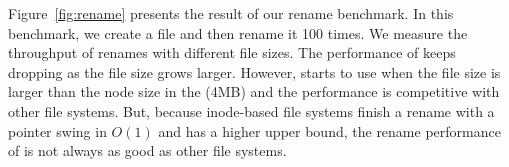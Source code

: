 Figure~\ref{fig:rename} presents the result of our rename benchmark. In this
benchmark, we create a file and then rename it 100 times.
We measure the throughput of renames with different file sizes.
The performance of \betrfsOne keeps dropping as the file size grows larger.
However, \betrfsFour starts to use \rr when the file size is larger than the
node size in the \bet (4MB) and the performance is competitive with other file
systems.
But, because inode-based file systems finish a rename with a pointer swing in
$O(1)$ and \betrfsFour has a higher upper bound, the rename performance of
\betrfsFour is not always as good as other file systems.

